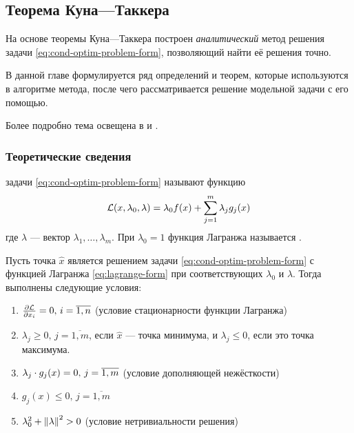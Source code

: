 \subsection{Теорема Куна—Таккера}
\label{sec:kuhn-tucker}

На основе теоремы Куна—Таккера построен \emph{аналитический} метод
решения задачи \eqref{eq:cond-optim-problem-form}, позволяющий найти
её решения точно. 

В данной главе формулируется ряд определений и теорем, которые
используются в алгоритме метода, после чего рассматривается решение
модельной задачи с его помощью.

Более подробно тема освещена в \cite{alekseev05} и \cite{taha05}.

\subsubsection{Теоретические сведения}

\begin{dfn}  задачи
  \eqref{eq:cond-optim-problem-form} называют функцию
  \begin{equation}
    \label{eq:lagrange-form}
    \mathcal{L}(x, \lambda_0, \lambda) = \lambda_0 f(x) + \sum_{j=1}^m {\lambda_j g_j(x)}
  \end{equation}
  где $\lambda$ — вектор $\lambda_1, \dotsc, \lambda_m$. При
  $\lambda_0=1$ функция Лагранжа называется .
\end{dfn}

\begin{thm}
  \label{th:kuhn-tucker}
  Пусть точка $\hat{x}$ является решением задачи
  \eqref{eq:cond-optim-problem-form} с функцией Лагранжа
  \eqref{eq:lagrange-form} при соответствующих $\lambda_0$ и
  $\lambda$. Тогда выполнены следующие условия:
  \begin{enumerate}
    \renewcommand{\labelenumi}{\emph{\asbuk{enumi})}}
  \item $\frac{\partial{\mathcal{L}}}{\partial{x_i}}=0,\, i=\overline{1,n}$ (условие
    стационарности функции Лагранжа)
  \item $\lambda_j \geq 0,\, j=\overline{1,m}$, если $\hat{x}$ — точка
    минимума, и $\lambda_j \leq 0$, если это точка максимума.
  \item $\lambda_j \cdot g_j(x) = 0,\, j=\overline{1,m}$ (условие
    дополняющей нежёсткости)
  \item $g_j(x) \leq 0,\, j=\overline{1,m}$
  \item $\lambda_0^2 + \left \lVert{\lambda}\right \rVert^2 > 0$ (условие нетривиальности решения)
  \end{enumerate}
\end{thm}

